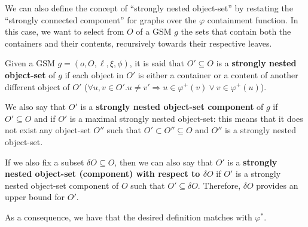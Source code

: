 We can also define the concept of ``strongly nested object-set'' by restating the ``strongly connected component'' for graphs over the $\varphi$ containment function. In this case, we want to select from $O$ of a GSM $g$ the sets that contain both the containers and their contents, recursively towards their respective leaves.

\begin{definition}\label{def:stronglynestedobjectset}
Given a GSM $g=(o,O,\ell,\xi,\phi)$, it is said that $O'\subseteq O$ is a \textbf{strongly nested object-set} of $g$ if each object in $O'$ is either a container or a content of another different object of $O'$ ($\forall u,v\in O'. u\neq v'\Rightarrow u\in\varphi^+(v)\vee v\in\varphi^+(u)$). \medskip

We also say that $O'$ is a \textbf{strongly nested object-set component} of $g$ if $O'\subseteq O$ and if $O'$ is a maximal strongly nested object-set: this means that it does not exist any object-set $O''$ such that $O'\subset O''\subseteq O$ and $O''$ is a strongly nested object-set. \medskip

If we also fix a subset $\delta O\subseteq O$, then we can also say that $O'$ is a \textbf{strongly nested object-set (component) with respect to $\delta O$} if $O'$ is a strongly nested object-set component of $O$ such that $O'\subseteq \delta O$. Therefore, $\delta O$ provides an upper bound for $O'$.
\end{definition}

As a consequence, we have that the desired definition matches with $\varphi^*$. 

